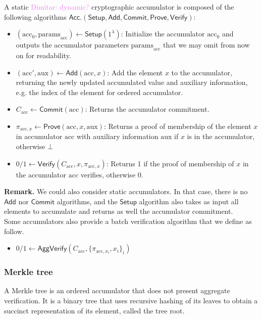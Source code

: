 \documentclass{article}
\newcommand{\acc}{\ensuremath{\textrm{acc}}\xspace}
\newcommand{\aux}{\ensuremath{\textrm{aux}}\xspace}
\newcommand{\pp}{\ensuremath{\textrm{params}}\xspace}
\newcommand{\Acc}{\ensuremath{\mathsf{Acc}}\xspace}
\newcommand{\Verify}{\ensuremath{\mathsf{Verify}}\xspace}
\newcommand{\AggVerify}{\ensuremath{\mathsf{AggVerify}}\xspace}
\newcommand{\Setup}{\ensuremath{\mathsf{Setup}}\xspace}
\newcommand{\Add}{\ensuremath{\mathsf{Add}}\xspace}
\newcommand{\Prove}{\ensuremath{\mathsf{Prove}}\xspace}
\newcommand{\Commit}{\ensuremath{\mathsf{Commit}}\xspace}
\newcommand{\dimitar}[1]{\textcolor{violet}{Dimitar: #1}\xspace}
\begin{document}
A static \dimitar{dynamic?} cryptographic accumulator is composed of the following algorithms $\Acc.(\Setup, \Add, \Commit, \Prove, \Verify)$:
\begin{itemize}
    \item $(\acc_0, \pp_\acc) \leftarrow \Setup(1^\lambda)$: Initialize the accumulator $\acc_0$ and outputs the accumulator parameters $\pp_\acc$ that we may omit from now on for readability.
    \item $(\acc', \aux) \leftarrow \Add(\acc, x)$: Add the element $x$ to the accumulator, returning the newly updated accumulated value and auxiliary information, e.g. the index of the element for ordered accumulator.
    \item $C_\acc \leftarrow \Commit(\acc)$: Returns the accumulator commitment.
    \item $\pi_{\acc, x} \leftarrow \Prove(\acc, x, \aux)$: Returns a proof of membership of the element $x$ in accumulator $\acc$ with auxiliary information $\aux$ if $x$ is in the accumulator, otherwise $\bot$
    \item $0/1 \leftarrow \Verify(C_\acc, x, \pi_{\acc, x})$: Returns 1 if the proof of membership of $x$ in the accumulator $\acc$ verifies, otherwise 0.
\end{itemize}

\noindent\textbf{Remark.} We could also consider static accumulators. In that case, there is no \Add nor \Commit algorithms, and the \Setup algorithm also takes as input all elements to accumulate and returns as well the accumulator commitment.\\

Some accumulators also provide a batch verification algorithm that we define as follow.
\begin{itemize}
    \item $0/1 \leftarrow \AggVerify(C_\acc, \{\pi_{\acc, x_i}, x_i\}_i)$
\end{itemize}

%
\subsubsection{Merkle tree}
A Merkle tree is an ordered accumulator that does not present aggregate verification. It is a binary tree that uses recursive hashing of its leaves to obtain a succinct representation of its element, called the tree root. 
\end{document}
